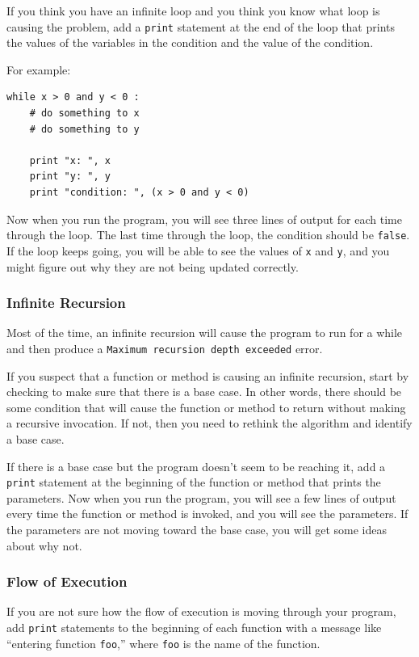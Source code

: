 \documentclass[10pt]{book}
\begin{document}
If you think you have an infinite loop and you think you know
what loop is causing the problem, add a {\tt print} statement at
the end of the loop that prints the values of the variables in
the condition and the value of the condition.

For example:

\begin{verbatim}
while x > 0 and y < 0 :
    # do something to x
    # do something to y

    print "x: ", x
    print "y: ", y
    print "condition: ", (x > 0 and y < 0)
\end{verbatim}
%
Now when you run the program, you will see three lines of output
for each time through the loop.  The last time through the
loop, the condition should be {\tt false}.  If the loop keeps
going, you will be able to see the values of {\tt x} and {\tt y},
and you might figure out why they are not being updated correctly.


\subsubsection{Infinite Recursion}

Most of the time, an infinite recursion will cause the program to run
for a while and then produce a {\tt Maximum recursion depth exceeded}
error.

If you suspect that a function or method is causing an infinite
recursion, start by checking to make sure that there is a base case.
In other words, there should be some condition that will cause the
function or method to return without making a recursive invocation.
If not, then you need to rethink the algorithm and identify a base
case.

If there is a base case but the program doesn't seem to be reaching
it, add a {\tt print} statement at the beginning of the function or method
that prints the parameters.  Now when you run the program, you will see
a few lines of output every time the function or method is invoked,
and you will see the parameters.  If the parameters are not moving
toward the base case, you will get some ideas about why not.


\subsubsection{Flow of Execution}

If you are not sure how the flow of execution is moving through
your program, add {\tt print} statements to the beginning of each
function with a message like ``entering function {\tt foo},'' where
{\tt foo} is the name of the function.
\end{document}
